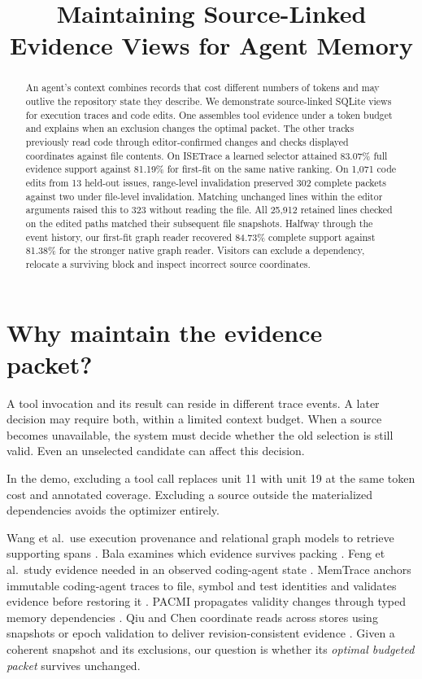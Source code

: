 \documentclass[conference]{IEEEtran}
\title{Maintaining Source-Linked Evidence Views for Agent Memory}
\author{}
\begin{document}
\maketitle
\begin{abstract}
An agent's context combines records that cost different numbers of tokens and may outlive the repository state they describe. We demonstrate source-linked SQLite views for execution traces and code edits. One assembles tool evidence under a token budget and explains when an exclusion changes the optimal packet. The other tracks previously read code through editor-confirmed changes and checks displayed coordinates against file contents. On ISETrace a learned selector attained 83.07\% full evidence support against 81.19\% for first-fit on the same native ranking. On 1,071 code edits from 13 held-out issues, range-level invalidation preserved 302 complete packets against two under file-level invalidation. Matching unchanged lines within the editor arguments raised this to 323 without reading the file. All 25,912 retained lines checked on the edited paths matched their subsequent file snapshots. Halfway through the event history, our first-fit graph reader recovered 84.73\% complete support against 81.38\% for the stronger native graph reader. Visitors can exclude a dependency, relocate a surviving block and inspect incorrect source coordinates.

\end{abstract}

\section{Why maintain the evidence packet?}

A tool invocation and its result can reside in different trace events. A later decision may require both, within a limited context budget. When a source becomes unavailable, the system must decide whether the old selection is still valid. Even an unselected candidate can affect this decision.

In the demo, excluding a tool call replaces unit 11 with unit 19 at the same token cost and annotated coverage. Excluding a source outside the materialized dependencies avoids the optimizer entirely.

Wang et al.\ use execution provenance and relational graph models to retrieve supporting spans \cite{wang}. Bala examines which evidence survives packing \cite{bala}. Feng et al.\ study evidence needed in an observed coding-agent state \cite{feng}. MemTrace anchors immutable coding-agent traces to file, symbol and test identities and validates evidence before restoring it \cite{memtrace}. PACMI propagates validity changes through typed memory dependencies \cite{pacmi}. Qiu and Chen coordinate reads across stores using snapshots or epoch validation to deliver revision-consistent evidence \cite{readboundaries}. Given a coherent snapshot and its exclusions, our question is whether its \emph{optimal budgeted packet} survives unchanged.
\end{document}
